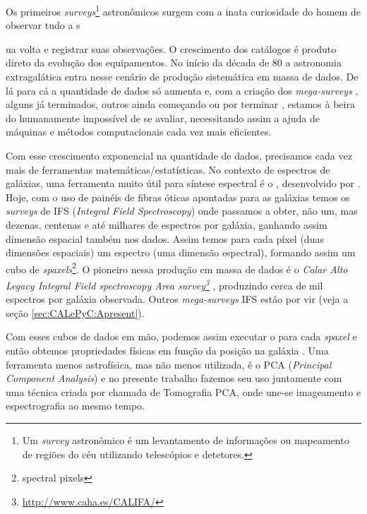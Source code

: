 Os primeiros {\em surveys}\footnote{Um {\em survey} astronômico é um
levantamento de informações ou mapeamento de regiões do céu utilizando
telescópios e detetores.} astronômicos surgem com a inata curiosidade do homem
de observar tudo a s


ua volta e registrar suas observações. O crescimento dos
catálogos é produto direto da evolução dos equipamentos. No início da década de
80 \citep{Huchra1983, Huchra1988, DaCosta1988} a astronomia extragalática
entra nesse cenário de produção sistemática em massa de dados. De lá para cá a
quantidade de dados só aumenta e, com a criação dos {\em mega-surveys}
\citep[\SDSS; ][]{York2000} \citep[2dFGRS;][]{Colless1999}
\citep[2MASS;][]{Skrutskie2006}, alguns já terminados, outros ainda começando
ou por terminar \citep[LSST; ][]{Ivezic2008} \citep[J-PAS;][]{Benitez2009},
estamos à beira do humanamente impossível de se avaliar, necessitando assim a
ajuda de máquinas e métodos computacionais cada vez mais eficientes.

Com esse crescimento exponencial na quantidade de dados, precisamos cada vez
mais de ferramentas matemáticas/estatísticas. No contexto de espectros de galáxias,
uma ferramenta muito útil para síntese espectral é o \starlight, desenvolvido
por \citet{CidFernandes2005}. Hoje, com o uso de painéis de fibras óticas
apontadas para as galáxias temos os {\em surveys} de IFS ({\em Integral Field
Spectroscopy}) onde passamos a obter, não um, mas dezenas, centenas e até
milhares de espectros por galáxia, ganhando assim dimensão espacial também nos
dados. Assim temos para cada píxel (duas dimensões espaciais) um espectro (uma
dimensão espectral), formando assim um cubo de {\em spaxels}\footnote{spectral
pixels}. O pioneiro nessa produção em massa de dados é o {\em Calar Alto Legacy
Integral Field spectroscopy Area
survey\footnote{\url{http://www.caha.es/CALIFA/}}} \citep[CALIFA;
][]{CALIFAPresent2012}, produzindo cerca de mil espectros por galáxia observada.
Outros {\em mega-surveys} IFS estão por vir (veja a seção
\ref{sec:CALePyC:Apresent}).

Com esses cubos de dados em mão, podemos assim executar o \starlight para
cada {\em spaxel} e então obtemos propriedades físicas em função da posição na
galáxia \citep{CidFernandes2013a}. Uma ferramenta menos astrofísica, mas não
menos utilizada, é o PCA ({\em Principal Component Analysis}) e no presente
trabalho fazemos seu uso juntamente com uma técnica criada por
\citet{Steiner2009} chamada de Tomografia PCA, onde une-se imageamento e
espectrografia ao mesmo tempo.

